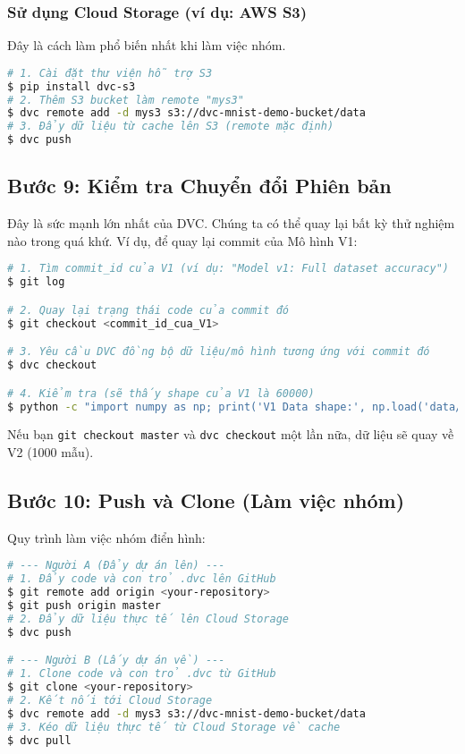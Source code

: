 \documentclass[11pt]{article}
\begin{document}
\subsubsection{Sử dụng Cloud Storage (ví dụ: AWS S3)}
Đây là cách làm phổ biến nhất khi làm việc nhóm.
\begin{lstlisting}[language=bash]
# 1. Cài đặt thư viện hỗ trợ S3
$ pip install dvc-s3
# 2. Thêm S3 bucket làm remote "mys3"
$ dvc remote add -d mys3 s3://dvc-mnist-demo-bucket/data
# 3. Đẩy dữ liệu từ cache lên S3 (remote mặc định)
$ dvc push
\end{lstlisting}

\subsection{Bước 9: Kiểm tra Chuyển đổi Phiên bản}
Đây là sức mạnh lớn nhất của DVC. Chúng ta có thể quay lại bất kỳ thử nghiệm nào trong quá khứ.
Ví dụ, để quay lại commit của Mô hình V1:
\begin{lstlisting}[language=bash]
# 1. Tìm commit_id của V1 (ví dụ: "Model v1: Full dataset accuracy")
$ git log

# 2. Quay lại trạng thái code của commit đó
$ git checkout <commit_id_cua_V1>

# 3. Yêu cầu DVC đồng bộ dữ liệu/mô hình tương ứng với commit đó
$ dvc checkout

# 4. Kiểm tra (sẽ thấy shape của V1 là 60000)
$ python -c "import numpy as np; print('V1 Data shape:', np.load('data/raw/x_train.npy').shape)"
\end{lstlisting}
Nếu bạn \texttt{git checkout master} và \texttt{dvc checkout} một lần nữa, dữ liệu sẽ quay về V2 (1000 mẫu).

\subsection{Bước 10: Push và Clone (Làm việc nhóm)}
Quy trình làm việc nhóm điển hình:
\begin{lstlisting}[language=bash]
# --- Người A (Đẩy dự án lên) ---
# 1. Đẩy code và con trỏ .dvc lên GitHub
$ git remote add origin <your-repository>
$ git push origin master
# 2. Đẩy dữ liệu thực tế lên Cloud Storage
$ dvc push

# --- Người B (Lấy dự án về) ---
# 1. Clone code và con trỏ .dvc từ GitHub
$ git clone <your-repository>
# 2. Kết nối tới Cloud Storage
$ dvc remote add -d mys3 s3://dvc-mnist-demo-bucket/data
# 3. Kéo dữ liệu thực tế từ Cloud Storage về cache
$ dvc pull
\end{lstlisting}
\end{document}

